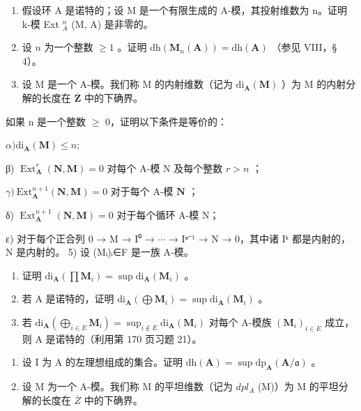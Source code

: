 \begin{enumerate}
\def\labelenumi{\arabic{enumi})}
\setcounter{enumi}{1}
\item
  假设环 A 是诺特的；设 M 是一个有限生成的 A-模，其投射维数为 n。证明 k-模 Ext \(_{A}^{n}\) (M, A) 是非零的。
\item
  设 \(n\) 为一个整数 \(\geqslant 1\) 。证明 \(\mathrm{dh}(\mathbf{M}_n(\mathbf{A})) = \mathrm{dh}(\mathbf{A})\) （参见 VIII，§ 4）。
\item
  设 M 是一个 A-模。我们称 M 的内射维数（记为 \(\mathrm{di}_{\mathbf{A}}(\mathbf{M})\) ）为 M 的内射分解的长度在 \(\overline{\mathbf{Z}}\) 中的下确界。
\end{enumerate}

如果 n 是一个整数 \(\geqslant\) 0，证明以下条件是等价的：

\(\alpha)\mathrm{di}_{\mathbf{A}}(\mathbf{M})\leqslant n;\)

β) \(\operatorname{Ext}_{\mathbf{A}}^{r}(\mathbf{N},\mathbf{M}) = 0\) 对每个 A-模 N 及每个整数 \(r > n\) ；

\(\gamma)\ \mathrm{Ext}_{\mathbf{A}}^{n+1}(\mathbf{N},\mathbf{M}) = 0\) 对于每个 A-模 \(\mathbf{N}\) ；

δ) \(\operatorname{Ext}_{\mathbf{A}}^{n+1}(\mathbf{N},\mathbf{M})=0\) 对于每个循环 A-模 N；

ε) 对于每个正合列 0 → M → I⁰ → \(\cdots\) → Iⁿ⁻¹ → N → 0，其中诸 Iᵏ 都是内射的，N 是内射的。 5) 设 (Mᵢ)ᵢ∈F 是一族 A-模。

\begin{enumerate}
\def\labelenumi{\alph{enumi})}
\item
  证明 \(\mathrm{di}_{\mathbf{A}}(\prod \mathbf{M}_i) = \sup \mathrm{di}_{\mathbf{A}}(\mathbf{M}_i)\) 。
\item
  若 A 是诺特的，证明 \(\mathrm{di}_{\mathbf{A}}(\bigoplus \mathbf{M}_i) = \sup \mathrm{di}_{\mathbf{A}}(\mathbf{M}_i)\) 。
\item
  若 \(\mathrm{di}_{\mathbf{A}}(\bigoplus_{i\in E}\mathbf{M}_{i}) = \sup_{i\notin E}\mathrm{di}_{\mathbf{A}}(\mathbf{M}_{i})\) 对每个 A-模族 \((\mathbf{M}_i)_{i\in E}\) 成立，则 A 是诺特的（利用第 170 页习题 21）。
\end{enumerate}

\begin{enumerate}
\def\labelenumi{\arabic{enumi})}
\setcounter{enumi}{5}
\item
  设 I 为 A 的左理想组成的集合。证明 \(\mathrm{dh}(\mathbf{A}) = \sup \mathrm{dp}_{\mathbf{A}}(\mathbf{A}/\mathfrak{a})\) 。
\item
  设 M 为一个 A-模。我们称 M 的平坦维数（记为 \(dpl_{A}\) (M)）为 M 的平坦分解的长度在 \(\overline{Z}\) 中的下确界。
\end{enumerate}

